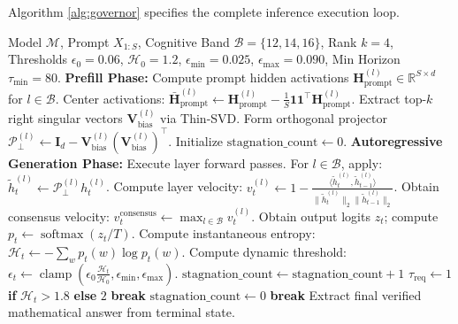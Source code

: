 \documentclass[10pt,twocolumn]{article}
\begin{document}
Algorithm \ref{alg:governor} specifies the complete inference execution loop.

\begin{algorithm}[t]
\caption{SubNeutralize Runtime Inference Governor}
\label{alg:governor}
\small
\begin{algorithmic}[1]
\REQUIRE Model $\mathcal{M}$, Prompt $X_{1:S}$, Cognitive Band $\mathcal{B}=\{12, 14, 16\}$, Rank $k=4$, Thresholds $\epsilon_0=0.06$, $\mathcal{H}_0=1.2$, $\epsilon_{\min}=0.025$, $\epsilon_{\max}=0.090$, Min Horizon $\tau_{\min}=80$.
\STATE \textbf{Prefill Phase:}
\STATE Compute prompt hidden activations $\mathbf{H}_{\text{prompt}}^{(l)} \in \mathbb{R}^{S \times d}$ for $l \in \mathcal{B}$.
\STATE Center activations: $\bar{\mathbf{H}}_{\text{prompt}}^{(l)} \leftarrow \mathbf{H}_{\text{prompt}}^{(l)} - \frac{1}{S} \mathbf{1}\mathbf{1}^\top \mathbf{H}_{\text{prompt}}^{(l)}$.
\STATE Extract top-$k$ right singular vectors $\mathbf{V}_{\text{bias}}^{(l)}$ via Thin-SVD.
\STATE Form orthogonal projector $\mathcal{P}_{\perp}^{(l)} \leftarrow \mathbf{I}_d - \mathbf{V}_{\text{bias}}^{(l)} (\mathbf{V}_{\text{bias}}^{(l)})^\top$.
\STATE Initialize $\text{stagnation\_count} \leftarrow 0$.
\STATE \textbf{Autoregressive Generation Phase:}
    \STATE Execute layer forward passes. For $l \in \mathcal{B}$, apply:
    \STATE $\tilde{h}_t^{(l)} \leftarrow \mathcal{P}_{\perp}^{(l)} h_t^{(l)}$.
    \STATE Compute layer velocity: $v_t^{(l)} \leftarrow 1 - \frac{\langle \tilde{h}_t^{(l)}, \tilde{h}_{t-1}^{(l)} \rangle}{\|\tilde{h}_t^{(l)}\|_2 \|\tilde{h}_{t-1}^{(l)}\|_2}$.
    \STATE Obtain consensus velocity: $v_t^{\text{consensus}} \leftarrow \max_{l \in \mathcal{B}} v_t^{(l)}$.
    \STATE Obtain output logits $z_t$; compute $p_t \leftarrow \operatorname{softmax}(z_t / T)$.
    \STATE Compute instantaneous entropy: $\mathcal{H}_t \leftarrow -\sum_{w} p_t(w) \log p_t(w)$.
    \STATE Compute dynamic threshold: $\epsilon_t \leftarrow \operatorname{clamp}\left(\epsilon_0 \frac{\mathcal{H}_t}{\mathcal{H}_0}, \epsilon_{\min}, \epsilon_{\max}\right)$.
        \STATE $\text{stagnation\_count} \leftarrow \text{stagnation\_count} + 1$
        \STATE $\tau_{\text{req}} \leftarrow 1$ \textbf{if} $\mathcal{H}_t > 1.8$ \textbf{else} $2$
            \STATE \textbf{break} 
        \ENDIF
    \ELSE
        \STATE $\text{stagnation\_count} \leftarrow 0$
    \ENDIF
        \STATE \textbf{break}
    \ENDIF
\ENDFOR
\STATE Extract final verified mathematical answer from terminal state.
\end{algorithmic}
\end{algorithm}
\end{document}
